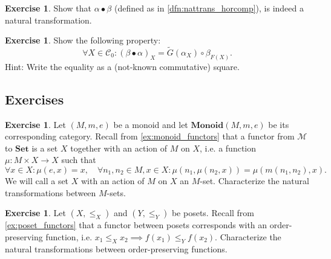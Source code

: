 \documentclass[a4paper,10pt]{scrartcl}
\theoremstyle{plain}
\theoremstyle{definition}
\newtheorem{exer}[thm]{Exercise}
\newcommand{\Cat}[1]{\mathcal{#1}}
\newcommand{\CC}{\Cat{C}}
\newcommand{\Catb}[1]{\mathbf{#1}}
\newcommand{\SET}{\Catb{Set}}
\newcommand{\MON}{\Catb{Monoid}}
\newcommand{\Ob}[1]{{#1}_0}
\newcommand{\co}[2]{\ensuremath{#2 \circ #1}}
\begin{document}
\begin{exer} Show that $\alpha\bullet\beta$ (defined as in \cref{dfn:nattrans_horcomp}), is indeed a natural transformation.
\end{exer}

\begin{exer} Show the following property: 
\[
\forall X\in \Ob{\CC}: (\beta\bullet\alpha)_X = \co{\beta_{F(X)}}{\tilde{G}(\alpha_X)}.
\]
Hint: Write the equality as a (not-known commutative) square.
\end{exer}

\subsection{Exercises}
\begin{exer} Let $(M,m,e)$ be a monoid and let $\MON(M,m,e)$ be its corresponding category. Recall from \cref{ex:monoid_functors} that a functor from $\mathcal{M}$ to $\SET$ is a set $X$ together with an action of $M$ on $X$, i.e. a function $\mu: M\times X\to X$ such that 
\[
\forall x\in X: \mu(e,x) = x, \quad \forall n_1,n_2\in M, x\in X: \mu(n_1, \mu(n_2,x)) = \mu(m(n_1,n_2), x).
\]
We will call a set $ X $ with an action of $ M $ on $ X $ an $ M $-set.
Characterize the natural transformations between $M$-sets.
\end{exer}

\begin{exer} Let $(X,\leq_X)$ and $(Y,\leq_Y)$ be posets. Recall from \cref{ex:poset_functors} that a functor between posets corresponds with an order-preserving function, i.e. $x_1 \leq_X x_2 \implies f(x_1) \leq_Y f(x_2)$. Characterize the natural transformations between order-preserving functions.
\end{exer}
\end{document}
